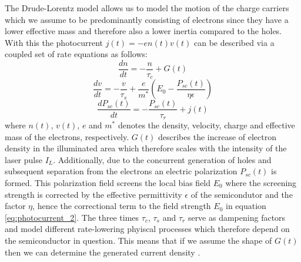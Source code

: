 The Drude-Lorentz model allows us to model the motion of the charge carriers which we assume to be predominantly consisting of electrons since they have a lower effective mass and therefore also a lower inertia compared to the holes. With this the photocurrent $j(t) = -e n(t) v(t)$ can be described via a coupled set of rate equations as follows:
\begin{equation}
    \frac{dn}{dt} = - \frac{n}{\tau_c} + G(t)
\end{equation}
\begin{equation}
    \label{eq:photocurrent_2}
    \frac{dv}{dt} = - \frac{v}{\tau_s} + \frac{e}{m^*}\left(E_0 - \frac{P_{sc}(t)}{\eta \epsilon} \right)
\end{equation}
\begin{equation}
    \frac{dP_{sc}(t)}{dt} = -\frac{P_{sc}(t)}{\tau_r}+j(t)
\end{equation}
where $n(t)$, $v(t)$, $e$ and $m^*$ denotes the density, velocity, charge and effective mass of the electrons, respectively. $G(t)$ describes the increase of electron density in the illuminated area which therefore scales with the intensity of the laser pulse $I_L$. Additionally, due to the concurrent generation of holes and subsequent separation from the electrons an electric polarization $P_{sc}(t)$ is formed. This polarization field screens the local bias field $E_0$ where the screening strength is corrected by the effective permittivity $\epsilon$ of the semicondutor and the factor $\eta$, hence the correctional term to the field strength $E_0$ in equation \ref{eq:photocurrent_2}. The three times $\tau_c$, $\tau_s$ and $\tau_r$ serve as dampening factors and model different rate-lowering phyiscal processes which therefore depend on the semiconductor in question. This means that if we assume the shape of $G(t)$ then we can determine the generated current density \cite{Rutz2007}.

